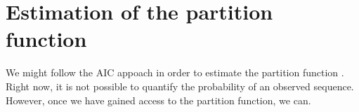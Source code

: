 \documentclass[12pt]{article}
\begin{document}
\section{Estimation of the partition function}
We might follow the AIC appoach in order to estimate the partition
function \cite{salakhutdinov2008quantitative}. Right now, it is not possible
to quantify the probability of an observed sequence. However, once we
have gained access to the partition function, we can.


\end{document}
